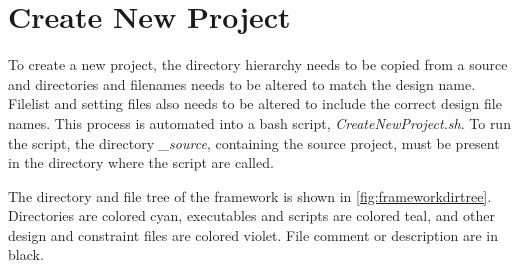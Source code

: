 \section{Create New Project}
To create a new project, the directory hierarchy needs to be copied from a source and directories and filenames needs to be altered to match the design name. Filelist and setting files also needs to be altered to include the correct design file names. This process is automated into a bash script, \textit{CreateNewProject.sh}. To run the script, the directory \textit{\_source}, containing the source project, must be present in the directory where the script are called.

The directory and file tree of the framework is shown in \cref{fig:frameworkdirtree}. Directories are colored cyan, executables and scripts are colored teal, and other design and constraint files are colored violet. File comment or description are in black.
